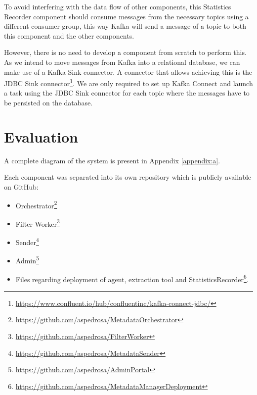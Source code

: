 To avoid interfering with the data flow of other components, this Statistics Recorder component should consume messages from the necessary topics using a different consumer group, this way Kafka will send a message of a topic to both this component and the other components.

However, there is no need to develop a component from scratch to perform this.
As we intend to move messages from Kafka into a relational database, we can make use of a Kafka Sink connector.
A connector that allows achieving this is the JDBC Sink connector\footnote{\url{https://www.confluent.io/hub/confluentinc/kafka-connect-jdbc/}}.
We are only required to set up Kafka Connect and launch a task using the JDBC Sink connector for each topic where the messages have to be persisted on the database.

\section{Evaluation}
A complete diagram of the system is present in Appendix \ref{appendix:a}.

Each component was separated into its own repository which is publicly available on GitHub:
\begin{itemize}
    \item Orchestrator\footnote{\url{https://github.com/aspedrosa/MetadataOrchestrator}}
    \item Filter Worker\footnote{\url{https://github.com/aspedrosa/FilterWorker}}
    \item Sender\footnote{\url{https://github.com/aspedrosa/MetadataSender}}
    \item Admin\footnote{\url{https://github.com/aspedrosa/AdminPortal}}
    \item Files regarding deployment of agent, extraction tool and StatisticsRecorder\footnote{\url{https://github.com/aspedrosa/MetadataManagerDeployment}}.
\end{itemize}

